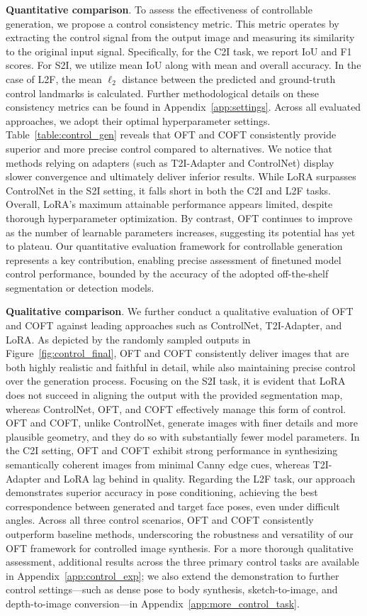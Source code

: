 {\textbf{Quantitative comparison}. To assess the effectiveness of controllable generation, we propose a control consistency metric. This metric operates by extracting the control signal from the output image and measuring its similarity to the original input signal. Specifically, for the C2I task, we report IoU and F1 scores. For S2I, we utilize mean IoU along with mean and overall accuracy. In the case of L2F, the mean $\ell_2$ distance between the predicted and ground-truth control landmarks is calculated. Further methodological details on these consistency metrics can be found in Appendix~\ref{app:settings}. Across all evaluated approaches, we adopt their optimal hyperparameter settings. Table~\ref{table:control_gen} reveals that OFT and COFT consistently provide superior and more precise control compared to alternatives. We notice that methods relying on adapters (such as T2I-Adapter and ControlNet) display slower convergence and ultimately deliver inferior results. While LoRA surpasses ControlNet in the S2I setting, it falls short in both the C2I and L2F tasks. Overall, LoRA's maximum attainable performance appears limited, despite thorough hyperparameter optimization. By contrast, OFT continues to improve as the number of learnable parameters increases, suggesting its potential has yet to plateau. Our quantitative evaluation framework for controllable generation represents a key contribution, enabling precise assessment of finetuned model control performance, bounded by the accuracy of the adopted off-the-shelf segmentation or detection models.

\textbf{Qualitative comparison}. We further conduct a qualitative evaluation of OFT and COFT against leading approaches such as ControlNet, T2I-Adapter, and LoRA. As depicted by the randomly sampled outputs in Figure~\ref{fig:control_final}, OFT and COFT consistently deliver images that are both highly realistic and faithful in detail, while also maintaining precise control over the generation process. Focusing on the S2I task, it is evident that LoRA does not succeed in aligning the output with the provided segmentation map, whereas ControlNet, OFT, and COFT effectively manage this form of control. OFT and COFT, unlike ControlNet, generate images with finer details and more plausible geometry, and they do so with substantially fewer model parameters. In the C2I setting, OFT and COFT exhibit strong performance in synthesizing semantically coherent images from minimal Canny edge cues, whereas T2I-Adapter and LoRA lag behind in quality. Regarding the L2F task, our approach demonstrates superior accuracy in pose conditioning, achieving the best correspondence between generated and target face poses, even under difficult angles. Across all three control scenarios, OFT and COFT consistently outperform baseline methods, underscoring the robustness and versatility of our OFT framework for controlled image synthesis. For a more thorough qualitative assessment, additional results across the three primary control tasks are available in Appendix~\ref{app:control_exp}; we also extend the demonstration to further control settings—such as dense pose to body synthesis, sketch-to-image, and depth-to-image conversion—in Appendix~\ref{app:more_control_task}.

}
